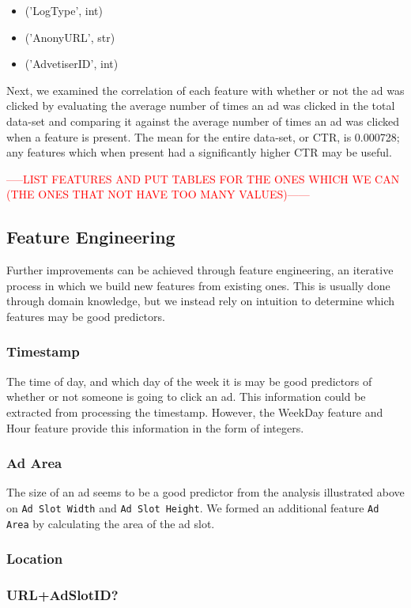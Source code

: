 \documentclass{article}
\begin{document}
		\begin{itemize}
			\item ('LogType', int)
			\item ('AnonyURL', str)
			\item ('AdvetiserID', int)
		\end{itemize}

		Next, we examined the correlation of each feature with whether or not the ad was clicked by evaluating the average number of times an ad was clicked in the
		total data-set and comparing it against the average number of times an ad was clicked when a feature is present. The mean for the entire data-set, or CTR,
		is 0.000728; any features which when present had a significantly higher CTR may be useful.

		\textcolor{red}{-----LIST FEATURES AND PUT TABLES FOR THE ONES WHICH WE CAN (THE ONES THAT NOT HAVE TOO MANY VALUES)------}

		\subsection{Feature Engineering}
		Further improvements can be achieved through feature engineering, an iterative process in which we build new features from existing ones. This is 
		usually done through domain knowledge, but we instead rely on intuition to determine which features may be good predictors. 
		\subsubsection{Timestamp}
		The time of day, and which day of the week it is may be good predictors of whether or not someone is going to click an ad. This information
		could be extracted from processing the timestamp. However, the WeekDay feature and Hour feature provide this information in the form of integers.
		\subsubsection{Ad Area}
		The size of an ad seems to be a good predictor from the analysis illustrated above on \texttt{Ad Slot Width} and \texttt{Ad Slot Height}. We formed
		an additional feature \texttt{Ad Area} by calculating the area of the ad slot. 
		\subsubsection{Location}
		\subsubsection{URL+AdSlotID?}
\end{document}
